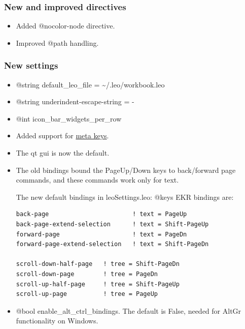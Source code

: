 \documentclass[a4paper,10pt,english]{sphinxmanual}
\begin{document}
\subsubsection{New and improved directives}
\label{what-is-new:new-and-improved-directives}\begin{itemize}
\item {} 
Added @nocolor-node directive.

\item {} 
Improved @path handling.

\end{itemize}


\subsubsection{New settings}
\label{what-is-new:id7}\begin{itemize}
\item {} 
@string default\_leo\_file = \textasciitilde{}/.leo/workbook.leo

\item {} 
@string underindent-escape-string = -

\item {} 
@int icon\_bar\_widgets\_per\_row

\item {} 
Added support for \href{http://groups.google.com/group/leo-editor/browse\_thread/thread/b6a39ed672a28c65?pli=1}{meta keys}.

\item {} 
The qt gui is now the default.

\item {} 
The old bindings bound the PageUp/Down keys to back/forward page commands, and
these commands work only for text.

The new default bindings in leoSettings.leo: @keys EKR bindings are:

\begin{Verbatim}[commandchars=\\\{\}]
back-page                       ! text = PageUp
back-page-extend-selection      ! text = Shift-PageUp
forward-page                    ! text = PageDn
forward-page-extend-selection   ! text = Shift-PageDn

scroll-down-half-page   ! tree = Shift-PageDn
scroll-down-page        ! tree = PageDn
scroll-up-half-page     ! tree = Shift-PageUp
scroll-up-page          ! tree = PageUp
\end{Verbatim}

\item {} 
@bool enable\_alt\_ctrl\_bindings.
The default is False, needed for AltGr functionality on Windows.

\end{itemize}
\end{document}
